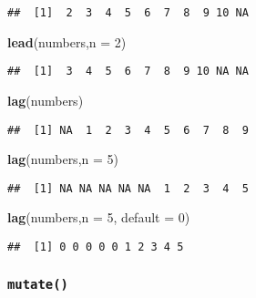 \documentclass[
]{article}
\newenvironment{Shaded}{\begin{snugshade}}{\end{snugshade}}
\newcommand{\DataTypeTok}[1]{\textcolor[rgb]{0.13,0.29,0.53}{#1}}
\newcommand{\DecValTok}[1]{\textcolor[rgb]{0.00,0.00,0.81}{#1}}
\newcommand{\KeywordTok}[1]{\textcolor[rgb]{0.13,0.29,0.53}{\textbf{#1}}}
\newcommand{\NormalTok}[1]{#1}
\begin{document}
\begin{verbatim}
##  [1]  2  3  4  5  6  7  8  9 10 NA
\end{verbatim}

\begin{Shaded}
\begin{Highlighting}[]
\KeywordTok{lead}\NormalTok{(numbers,}\DataTypeTok{n =} \DecValTok{2}\NormalTok{)}
\end{Highlighting}
\end{Shaded}

\begin{verbatim}
##  [1]  3  4  5  6  7  8  9 10 NA NA
\end{verbatim}

\begin{Shaded}
\begin{Highlighting}[]
\KeywordTok{lag}\NormalTok{(numbers)}
\end{Highlighting}
\end{Shaded}

\begin{verbatim}
##  [1] NA  1  2  3  4  5  6  7  8  9
\end{verbatim}

\begin{Shaded}
\begin{Highlighting}[]
\KeywordTok{lag}\NormalTok{(numbers,}\DataTypeTok{n =} \DecValTok{5}\NormalTok{)}
\end{Highlighting}
\end{Shaded}

\begin{verbatim}
##  [1] NA NA NA NA NA  1  2  3  4  5
\end{verbatim}

\begin{Shaded}
\begin{Highlighting}[]
\KeywordTok{lag}\NormalTok{(numbers,}\DataTypeTok{n =} \DecValTok{5}\NormalTok{, }\DataTypeTok{default =} \DecValTok{0}\NormalTok{)}
\end{Highlighting}
\end{Shaded}

\begin{verbatim}
##  [1] 0 0 0 0 0 1 2 3 4 5
\end{verbatim}

\hypertarget{mutate}{%
\subsubsection{\texorpdfstring{\texttt{mutate()}}{mutate()}}\label{mutate}}
\end{document}
